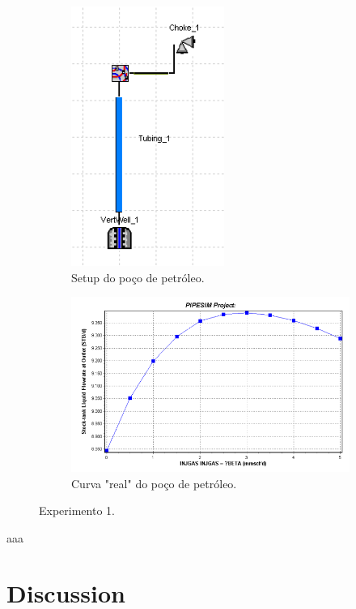 \begin{figure}
\centering
\begin{subfigure}{.4\textwidth}
  \centering
  \includegraphics[height=1\linewidth]{figs/setup1.png}
  \caption{Setup do poço de petróleo.}
  \label{fig:setup1_dia}
\end{subfigure}%
\begin{subfigure}{.6\textwidth}
  \centering
  \includegraphics[height=0.7\linewidth]{figs/truth1.png}
  \caption{Curva "real" do poço de petróleo.}
  \label{fig:truth1}
\end{subfigure}
\caption{Experimento 1.}
\label{fig:setup1}
\end{figure}

aaa
\section{Discussion}




